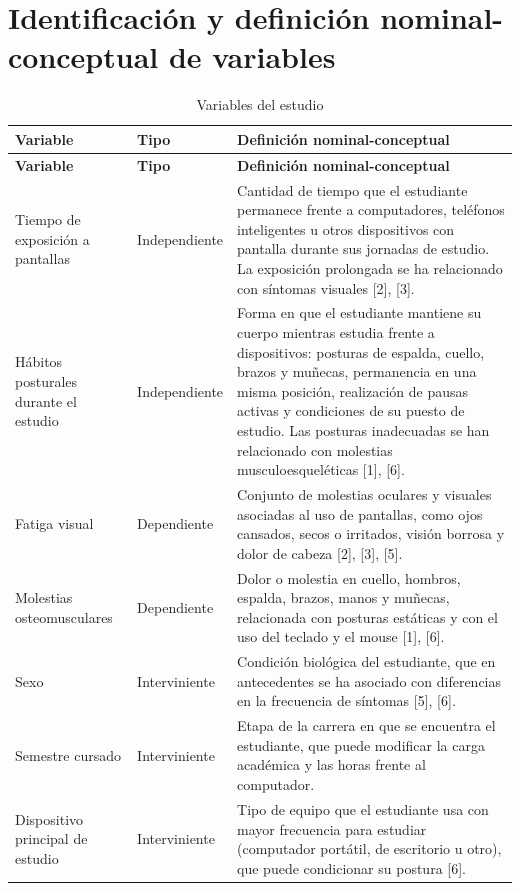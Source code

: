 
\section{Identificación y definición nominal-conceptual de variables}

\begin{center}
\small
\begin{longtable}{L{4cm} L{2.6cm} L{8.2cm}}
\caption{Variables del estudio} \\
\toprule
\textbf{Variable} & \textbf{Tipo} & \textbf{Definición nominal-conceptual} \\
\midrule
\endfirsthead
\toprule
\textbf{Variable} & \textbf{Tipo} & \textbf{Definición nominal-conceptual} \\
\midrule
\endhead
Tiempo de exposición a pantallas & Independiente & Cantidad de tiempo que el estudiante permanece frente a computadores, teléfonos inteligentes u otros dispositivos con pantalla durante sus jornadas de estudio. La exposición prolongada se ha relacionado con síntomas visuales [2], [3]. \\
\midrule
Hábitos posturales durante el estudio & Independiente & Forma en que el estudiante mantiene su cuerpo mientras estudia frente a dispositivos: posturas de espalda, cuello, brazos y muñecas, permanencia en una misma posición, realización de pausas activas y condiciones de su puesto de estudio. Las posturas inadecuadas se han relacionado con molestias musculoesqueléticas [1], [6]. \\
\midrule
Fatiga visual & Dependiente & Conjunto de molestias oculares y visuales asociadas al uso de pantallas, como ojos cansados, secos o irritados, visión borrosa y dolor de cabeza [2], [3], [5]. \\
\midrule
Molestias osteomusculares & Dependiente & Dolor o molestia en cuello, hombros, espalda, brazos, manos y muñecas, relacionada con posturas estáticas y con el uso del teclado y el mouse [1], [6]. \\
\midrule
Sexo & Interviniente & Condición biológica del estudiante, que en antecedentes se ha asociado con diferencias en la frecuencia de síntomas [5], [6]. \\
\midrule
Semestre cursado & Interviniente & Etapa de la carrera en que se encuentra el estudiante, que puede modificar la carga académica y las horas frente al computador. \\
\midrule
Dispositivo principal de estudio & Interviniente & Tipo de equipo que el estudiante usa con mayor frecuencia para estudiar (computador portátil, de escritorio u otro), que puede condicionar su postura [6]. \\
\bottomrule
\end{longtable}
\end{center}

